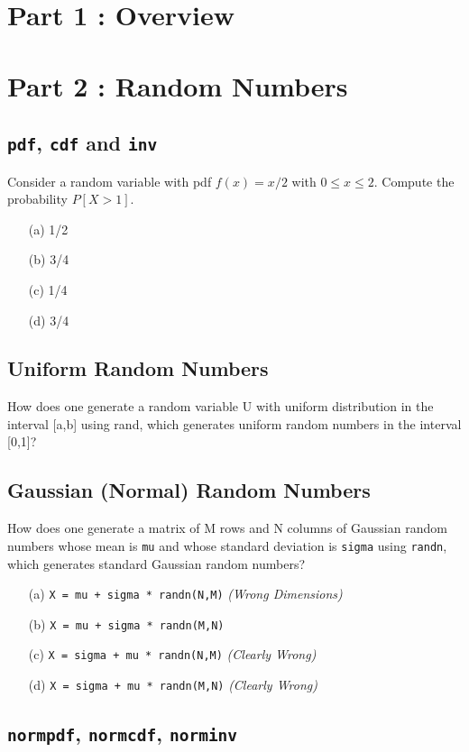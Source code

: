 \documentclass[]{article}
\begin{document}
\section{Part 1 : Overview}
\section{Part 2 : Random Numbers}
\subsection{\texttt{pdf}, \texttt{cdf} and \texttt{inv}}

Consider a random variable with pdf $f(x)=x/2$ with $0\leq x \leq 2$. Compute the probability $P[X>1]$.



\begin{itemize}

\item[(a)] 1/2


\item[(b)] 3/4


\item[(c)] 1/4


\item[(d)] 3/4

\end{itemize}
\subsection{Uniform Random Numbers}
How does one generate a random variable U with uniform distribution in the interval [a,b] using rand, which generates uniform random numbers in the interval [0,1]?

\subsection{Gaussian (Normal) Random Numbers}

How does one generate a matrix of M rows and N columns of Gaussian random numbers whose mean is \texttt{mu} and whose standard deviation is \texttt{sigma} using \texttt{randn}, which generates standard Gaussian random numbers?


\begin{itemize}

\item[(a)] \texttt{X = mu + sigma * randn(N,M)} \textit{(Wrong Dimensions)}


\item[(b)] \texttt{X = mu + sigma * randn(M,N)}


\item[(c)] \texttt{X = sigma + mu * randn(N,M)} \textit{(Clearly Wrong)}


\item[(d)] \texttt{X = sigma + mu * randn(M,N)} \textit{(Clearly Wrong)
}
\end{itemize}
 
 
 
\subsection{ \texttt{normpdf}, \texttt{normcdf}, \texttt{norminv}}
 

 



 
 
 
\end{document}

